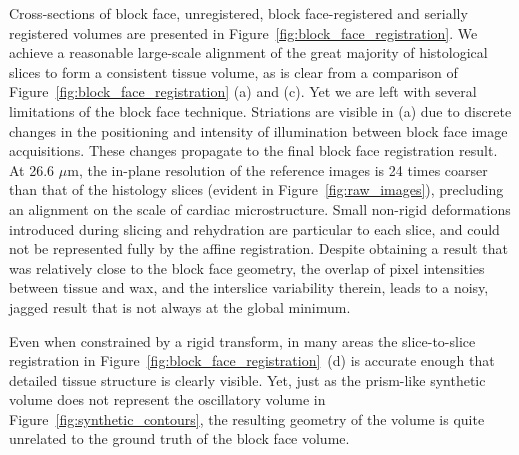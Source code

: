   Cross-sections of block face, unregistered, block face-registered and serially registered volumes are presented in Figure~\ref{fig:block_face_registration}. We achieve a reasonable large-scale alignment of the great majority of histological slices to form a consistent tissue volume, as is clear from a comparison of Figure~\ref{fig:block_face_registration} (a) and (c). Yet we are left with several limitations of the block face technique. Striations are visible in (a) due to discrete changes in the positioning and intensity of illumination between block face image acquisitions. These changes propagate to the final block face registration result. At 26.6 $\mu$m, the in-plane resolution of the reference images is 24 times coarser than that of the histology slices (evident in Figure~\ref{fig:raw_images}), precluding an alignment on the scale of cardiac microstructure. Small non-rigid deformations introduced during slicing and rehydration are particular to each slice, and could not be represented fully by the affine registration. Despite obtaining a result that was relatively close to the block face geometry, the overlap of pixel intensities between tissue and wax, and the interslice variability therein, leads to a noisy, jagged result that is not always at the global minimum.
  
  Even when constrained by a rigid transform, in many areas the slice-to-slice registration in Figure~\ref{fig:block_face_registration}~(d) is accurate enough that detailed tissue structure is clearly visible. Yet, just as the prism-like synthetic volume does not represent the oscillatory volume in Figure~\ref{fig:synthetic_contours}, the resulting geometry of the volume is quite unrelated to the ground truth of the block face volume.
  
